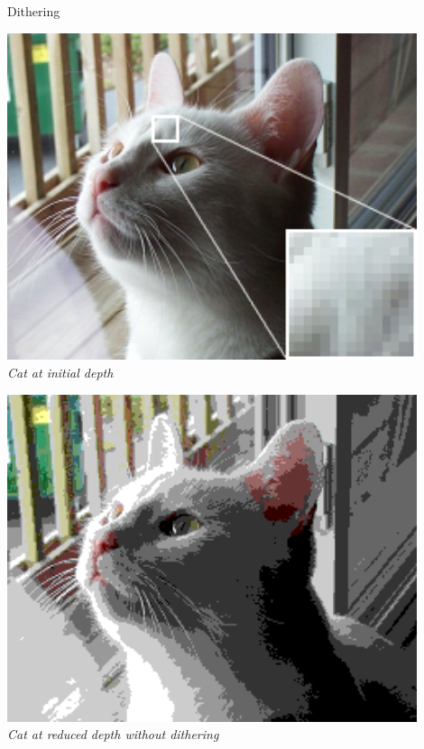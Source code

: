 \begin{frame}{Dithering}
  \begin{minipage}[t]{0.25\textwidth}
    \centering
    \includegraphics[width=0.9\textwidth]{slides/graphics-theory/cat-depth-initial.png}\\
    \textit{\small Cat at initial depth}
  \end{minipage}
  \hfill
  \begin{minipage}[t]{0.25\textwidth}
    \centering
    \includegraphics[width=0.9\textwidth]{slides/graphics-theory/cat-depth-low.png}\\
    \textit{\small Cat at reduced depth without dithering}
  \end{minipage}
  \hfill
  \begin{minipage}[t]{0.25\textwidth}
    \centering

\end{minipage}
\end{frame}
